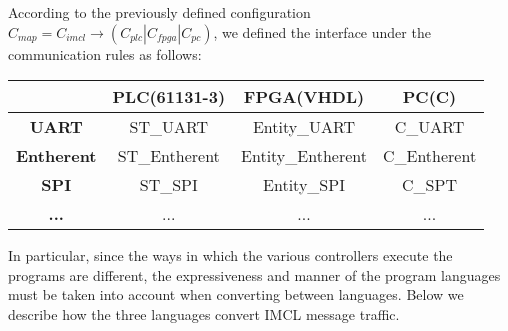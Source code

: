 According to the previously defined configuration $C_{map} = C_{imcl} \rightarrow (C_{plc} | C_{fpga} | C_{pc})$, we defined the interface under the communication rules as follows:

\begin{table}[!htb]
\centering
\small
    \begin{tabular}{|c|c|c|c|}
    \hline
    \textbf{ } & \textbf{PLC(61131-3)} & \textbf{FPGA(VHDL)} &  \textbf{PC(C)} \\
    \hline
    \textbf{UART}   & ST\_UART & Entity\_UART & C\_UART \\
    \textbf{Entherent} & ST\_Entherent & Entity\_Entherent & C\_Entherent \\
    \textbf{SPI} & ST\_SPI & Entity\_SPI & C\_SPT \\
    \textbf{...} & ... & ... & ... \\
    \hline
    \end{tabular}
\end{table}

In particular, since the ways in which the various controllers execute the programs are different, the expressiveness and manner of the program languages must be taken into account when converting between languages. Below we describe how the three languages convert IMCL message traffic.

